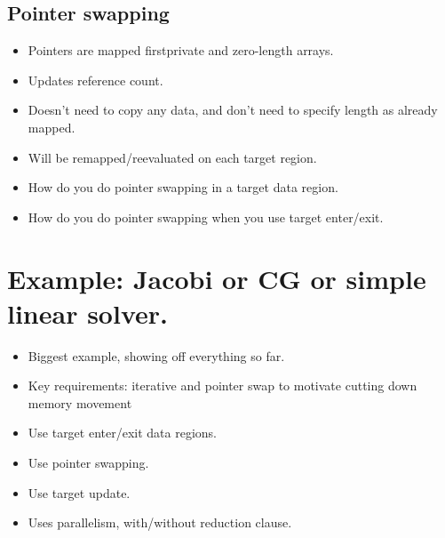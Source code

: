 \subsection{Pointer swapping}
\begin{itemize}
  \item Pointers are mapped firstprivate and zero-length arrays.
  \item Updates reference count.
  \item Doesn't need to copy any data, and don't need to specify length as already mapped.
  \item Will be remapped/reevaluated on each target region.
  \item How do you do pointer swapping in a target data region.
  \item How do you do pointer swapping when you use target enter/exit.
\end{itemize}

\section{Example: Jacobi or CG or simple linear solver.}
\begin{itemize}
  \item Biggest example, showing off everything so far.
  \item Key requirements: iterative and pointer swap to motivate cutting down memory movement
  \item Use target enter/exit data regions.
  \item Use pointer swapping.
  \item Use target update.
  \item Uses parallelism, with/without reduction clause.
\end{itemize}

